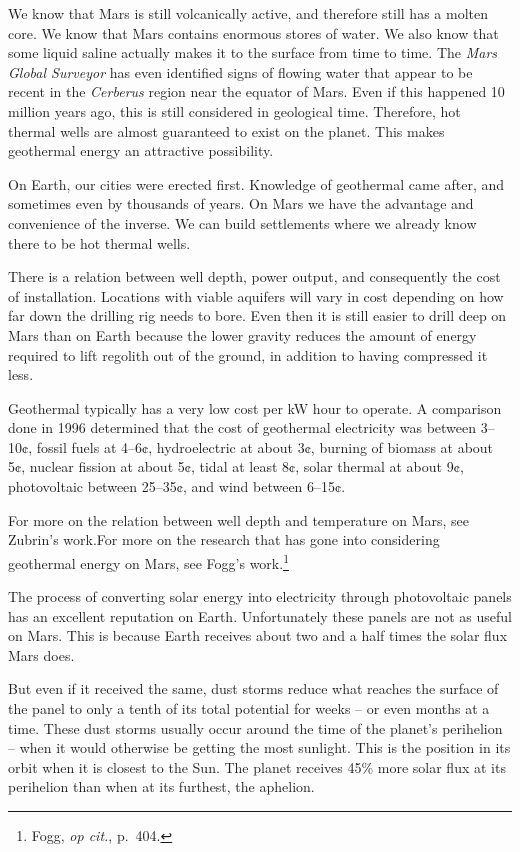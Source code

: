 We know that Mars is still volcanically active, and therefore still has a molten core. We know that Mars contains enormous stores of water. We also know that some liquid saline actually makes it to the surface from time to time. The {\it Mars Global Surveyor} has even identified signs of flowing water that appear to be recent in the {\it Cerberus} region near the equator of Mars. Even if this happened 10 million years ago, this is still considered  in geological time. Therefore, hot thermal wells are almost guaranteed to exist on the planet. This makes geothermal energy an attractive possibility.

On Earth, our cities were erected first. Knowledge of geothermal came after, and sometimes even by thousands of years. On Mars we have the advantage and convenience of the inverse. We can build settlements where we already know there to be hot thermal wells.

There is a relation between well depth, power output, and consequently the cost of installation. Locations with viable aquifers will vary in cost depending on how far down the drilling rig needs to bore. Even then it is still easier to drill deep on Mars than on Earth because the lower gravity reduces the amount of energy required to lift regolith out of the ground, in addition to having compressed it less.

Geothermal typically has a very low cost per kW hour to operate. A comparison done in 1996 determined that the cost of geothermal electricity was between 3--10¢, fossil fuels at 4--6¢, hydroelectric at about 3¢, burning of biomass at about 5¢, nuclear fission at about 5¢, tidal at least 8¢, solar thermal at about 9¢, photovoltaic between 25--35¢, and wind between 6--15¢.\footnotecite[fogg1996]

For more on the relation between well depth and temperature on Mars, see Zubrin's work. For more on the research that has gone into considering geothermal energy on Mars, see Fogg's work.\footnote{Fogg, {\it op cit.}, p.~404.}

The process of converting solar energy into electricity through photovoltaic panels has an excellent reputation on Earth. Unfortunately these panels are not as useful on Mars. This is because Earth receives about two and a half times the solar flux Mars does.

But even if it received the same, dust storms reduce what reaches the surface of the panel to only a tenth of its total potential for weeks -- or even months at a time. These dust storms usually occur around the time of the planet's perihelion -- when it would otherwise be getting the most sunlight. This is the position in its orbit when it is closest to the Sun. The planet receives 45\% more solar flux at its perihelion than when at its furthest, the aphelion. 

